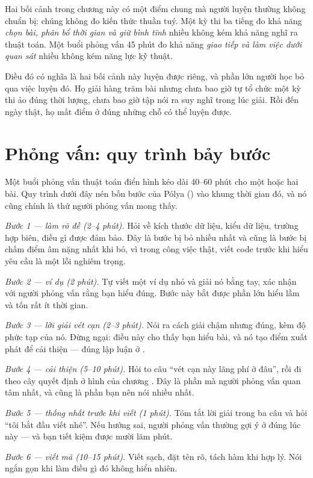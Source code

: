 \documentclass[../../algorithm.tex]{subfiles}
\begin{document}
Hai bối cảnh trong chương này có một điểm chung mà người luyện thường không chuẩn bị: chúng không đo kiến thức thuần tuý. Một kỳ thi ba tiếng đo khả năng \emph{chọn bài, phân bổ thời gian và giữ bình tĩnh} nhiều không kém khả năng nghĩ ra thuật toán. Một buổi phỏng vấn 45 phút đo khả năng \emph{giao tiếp và làm việc dưới quan sát} nhiều không kém năng lực kỹ thuật.

Điều đó có nghĩa là hai bối cảnh này luyện được riêng, và phần lớn người học bỏ qua việc luyện đó. Họ giải hàng trăm bài nhưng chưa bao giờ tự tổ chức một kỳ thi ảo đúng thời lượng, chưa bao giờ tập nói ra suy nghĩ trong lúc giải. Rồi đến ngày thật, họ mất điểm ở đúng những chỗ có thể luyện được.

\section{Phỏng vấn: quy trình bảy bước}

Một buổi phỏng vấn thuật toán điển hình kéo dài 40--60 phút cho một hoặc hai bài. Quy trình dưới đây nén bốn bước của Pólya () vào khung thời gian đó, và nó cũng chính là thứ người phỏng vấn mong thấy.

\emph{Bước 1 --- làm rõ đề (2--4 phút).} Hỏi về kích thước dữ liệu, kiểu dữ liệu, trường hợp biên, điều gì được đảm bảo. Đây là bước bị bỏ nhiều nhất và cũng là bước bị chấm điểm âm nặng nhất khi bỏ, vì trong công việc thật, viết code trước khi hiểu yêu cầu là một lỗi nghiêm trọng.

\emph{Bước 2 --- ví dụ (2 phút).} Tự viết một ví dụ nhỏ và giải nó bằng tay, xác nhận với người phỏng vấn rằng bạn hiểu đúng. Bước này bắt được phần lớn hiểu lầm và tốn rất ít thời gian.

\emph{Bước 3 --- lời giải vét cạn (2--3 phút).} Nói ra cách giải chậm nhưng đúng, kèm độ phức tạp của nó. Đừng ngại: điều này cho thấy bạn hiểu bài, và nó tạo điểm xuất phát để cải thiện --- đúng lập luận ở .

\emph{Bước 4 --- cải thiện (5--10 phút).} Hỏi to câu ``vét cạn này lãng phí ở đâu'', rồi đi theo cây quyết định ở hình của chương . Đây là phần mà người phỏng vấn quan tâm nhất, và cũng là phần bạn nên nói nhiều nhất.

\emph{Bước 5 --- thống nhất trước khi viết (1 phút).} Tóm tắt lời giải trong ba câu và hỏi ``tôi bắt đầu viết nhé''. Nếu hướng sai, người phỏng vấn thường gợi ý ở đúng lúc này --- và bạn tiết kiệm được mười lăm phút.

\emph{Bước 6 --- viết mã (10--15 phút).} Viết sạch, đặt tên rõ, tách hàm khi hợp lý. Nói ngắn gọn khi làm điều gì đó không hiển nhiên.
\end{document}
